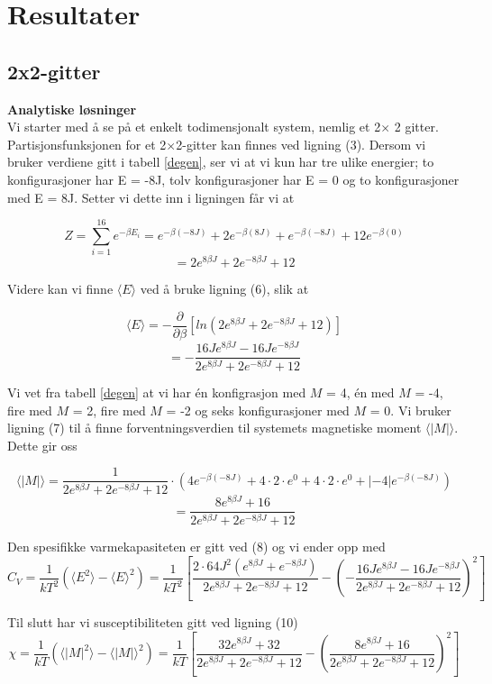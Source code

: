 \documentclass[11pt,a4paper]{article}
\begin{document}
\section{Resultater}
\subsection{2x2-gitter}
\textbf{Analytiske løsninger}\\
Vi starter med å se på et enkelt todimensjonalt system, nemlig et 2$\times$ 2 gitter. Partisjonsfunksjonen for et 2$\times$2-gitter kan finnes ved ligning (3). Dersom vi bruker verdiene gitt i tabell \ref{degen}, ser vi at vi kun har tre ulike energier; to konfigurasjoner har E = -8J, tolv konfigurasjoner har E = 0 og to konfigurasjoner med E = 8J. Setter vi dette inn i ligningen får vi at 

\[ Z = \sum_{i=1}^{16} e^{-\beta E_i} = e^{-\beta(-8J)} + 2e^{-\beta(8J)} + e^{- \beta(-8J)} + 12e^{-\beta(0)} \]
\[ = 2e^{8\beta J} + 2e^{-8 \beta J} + 12  \]

Videre kan vi finne $\langle E \rangle$ ved å bruke ligning (6), slik at 

\[\langle E \rangle = - \frac{\partial}{\partial \beta} \left[ ln(2e^{8\beta J} + 2e^{-8 \beta J} + 12) \right] \]
\[ = - \frac{16Je^{8\beta J} - 16Je^{-8\beta J}}{2e^{8\beta J} + 2e^{-8 \beta J} + 12 } \]

Vi vet fra tabell \ref{degen} at vi har én konfigrasjon med $M$ = 4, én med $M$ = -4, fire med $M$ = 2, fire med $M$ = -2 og seks konfigurasjoner med $M$ = 0. Vi bruker ligning (7) til å finne forventningsverdien til systemets magnetiske moment $\langle |M| \rangle$. Dette gir oss

\[ \langle |M| \rangle  = \frac{1}{2e^{8\beta J} + 2e^{-8 \beta J} + 12} \cdot (4e^{-\beta(-8J)} + 4\cdot 2 \cdot e^0 + 4\cdot 2 \cdot e^0 + | - 4|e^{-\beta(-8J)} )\]
\[ = \frac{8e^{8\beta J} + 16}{2e^{8\beta J} + 2e^{-8 \beta J} + 12} \]

Den spesifikke varmekapasiteten er gitt ved (8) og vi ender opp med
\[C_V = \frac{1}{kT^2}\left(\langle E^2 \rangle - \langle E \rangle^2 \right) = \frac{1}{kT^2}\left[ \frac{2\cdot 64J^2 (e^{8\beta J} + e^{-8\beta J})}{2e^{8\beta J} + 2e^{-8 \beta J} + 12} - \left( - \frac{16Je^{8\beta J} - 16Je^{-8\beta J}}{2e^{8\beta J} + 2e^{-8 \beta J} + 12 } \right)^2 \right]  \]

Til slutt har vi susceptibiliteten gitt ved ligning (10)
\[ \chi = \frac{1}{kT} (\langle |M|^2 \rangle - \langle |M| \rangle ^2 ) = \frac{1}{kT} \left[ \frac{32e^{8\beta J} + 32}{2e^{8\beta J} + 2e^{-8 \beta J} + 12 } - \left( \frac{8e^{8\beta J} + 16}{2e^{8\beta J} + 2e^{-8 \beta J} + 12 } \right)^2 \right]  \]
\end{document}
